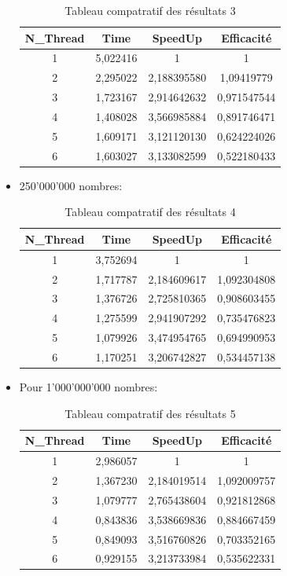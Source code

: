 \documentclass{report}
\begin{document}
\begin{itemize}
	\begin{table}[H]
			\center
			\begin{tabular}{|c|c|c|c|}
				\hline
				N\_Thread	&	Time	& SpeedUp	& Efficacité \\
				\hline
				1	&	5,022416	& 1	&	1	\\
				\hline
				2	&	2,295022	& 2,188395580	&	1,09419779	\\
				\hline
				3	&	1,723167	& 2,914642632		&	0,971547544	\\
				\hline
				4	&	1,408028	& 3,566985884	&	0,891746471	\\
				\hline
				5	&	1,609171	& 3,121120130	&	0,624224026	\\
				\hline
				6	&	1,603027	& 3,133082599		&	0,522180433\\
				\hline
			\end{tabular}
		\caption{Tableau compatratif des résultats 3}
	\end{table}
	\item 250'000'000 nombres:\\
	\begin{table}[H]
			\center
			\begin{tabular}{|c|c|c|c|}
				\hline
				N\_Thread	&	Time	& SpeedUp	& Efficacité \\
				\hline
				1	&	3,752694	& 1	&	1	\\
				\hline
				2	&	1,717787	& 2,184609617	&	1,092304808	\\
				\hline
				3	&	1,376726	& 2,725810365		&	0,908603455	\\
				\hline
				4	&	1,275599	& 2,941907292	&	0,735476823	\\
				\hline
				5	&	1,079926	& 3,474954765	&	0,694990953	\\
				\hline
				6	&	1,170251	& 3,206742827	&	0,534457138	\\
				\hline
			\end{tabular}
		\caption{Tableau compatratif des résultats 4}
	\end{table}
	\item Pour 1'000'000'000 nombres:\\
	\begin{table}[H]
			\center
			\begin{tabular}{|c|c|c|c|}
				\hline
				N\_Thread	&	Time	& SpeedUp	& Efficacité \\
				\hline
				1	&	2,986057	& 1	&	1	\\
				\hline
				2	&	1,367230	& 2,184019514	&	1,092009757	\\
				\hline
				3	&	1,079777	& 2,765438604		&	0,921812868	\\
				\hline
				4	&	0,843836	& 3,538669836	&	0,884667459	\\
				\hline
				5	&	0,849093	& 3,516760826		&	0,703352165\\
				\hline
				6	&	0,929155	& 3,213733984	&	0,535622331\\
				\hline
			\end{tabular}
		\caption{Tableau compatratif des résultats 5}
	\end{table}
\end{itemize}
\end{document}
